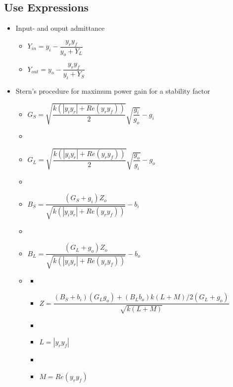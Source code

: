 \subsection{Use Expressions}
\begin{itemize}
	\item Input- and ouput admittance
	\begin{itemize}
		\item $Y_{in}=y_i-\dfrac{y_ry_f}{y_o+Y_L}$
		\item $Y_{out}=y_o-\dfrac{y_ry_f}{y_i+Y_S}$
	\end{itemize}
	\item Stern's procedure for maximum power gain for a stability factor
	\begin{itemize}
		\item $G_S=\sqrt{\dfrac{k(|y_iy_r|+Re(y_ry_f))}{2}}\sqrt{\dfrac{g_i}{g_o}}-g_i$
		\item[]
		\item $G_L=\sqrt{\dfrac{k(|y_iy_r|+Re(y_ry_f))}{2}}\sqrt{\dfrac{g_o}{g_i}}-g_o$
		\item[]
		\item $B_S=\dfrac{(G_S+g_i)Z_o}{\sqrt{k(|y_iy_r|+Re(y_ry_f))}}-b_i$
		\item[]
		\item $B_L=\dfrac{(G_L+g_o)Z_o}{\sqrt{k(|y_iy_r|+Re(y_ry_f))}}-b_o$
		\item[]
		\begin{itemize}
			\item[]
			\item $Z=\dfrac{(B_S+b_i)(G_Lg_o)+(B_Lb_o)k(L+M)/2(G_L+g_o)}{\sqrt{k(L+M)}}$
			\item[]
			\item $L = |y_ry_f|$
			\item[] 
			\item $M = Re(y_ry_f)$
		\end{itemize}
	\end{itemize}
\end{itemize}